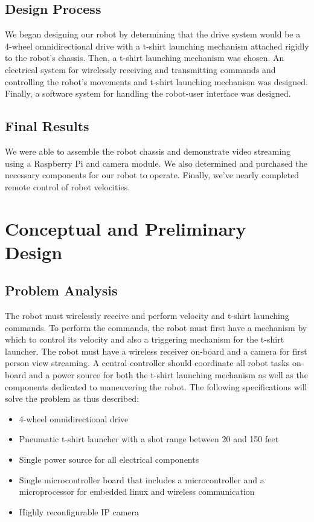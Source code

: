 \documentclass[letterpaper,12pt]{article}
\begin{document}
\subsection{Design Process}
\noindent We began designing our robot by determining that the drive system
would be a 4-wheel omnidirectional drive with a t-shirt launching mechanism
attached rigidly to the robot's chassis. Then, a t-shirt launching mechanism was
chosen. An electrical system for wirelessly receiving and transmitting commands
and controlling the robot's movements and t-shirt launching mechanism was
designed. Finally, a software system for handling the robot-user interface was
designed.

\subsection{Final Results}
\noindent We were able to assemble the robot chassis and demonstrate video
streaming using a Raspberry Pi and camera module. We also determined and
purchased the necessary components for our robot to operate. Finally, we've
nearly completed remote control of robot velocities.

\section{Conceptual and Preliminary Design}

\subsection{Problem Analysis}
\noindent The robot must wirelessly receive and perform velocity and t-shirt
launching commands. To perform the commands, the robot must first have a
mechanism by which to control its velocity and also a triggering mechanism for
the t-shirt launcher. The robot must have a wireless receiver on-board and a
camera for first person view streaming. A central controller should coordinate
all robot tasks on-board and a power source for both the t-shirt launching
mechanism as well as the components dedicated to maneuvering the robot. The
following specifications will solve the problem as thus described:
\begin{itemize}
    \item 4-wheel omnidirectional drive
    \item Pneumatic t-shirt launcher with a shot range between 20 and 150 feet
    \item Single power source for all electrical components
    \item Single microcontroller board that includes a microcontroller and a microprocessor for embedded linux and wireless communication
    \item Highly reconfigurable IP camera
\end{itemize}
\end{document}
